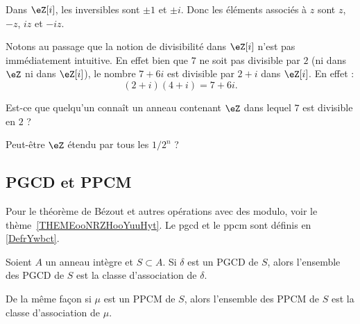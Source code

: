 \begin{example}
    Dans \( \eZ[i]\), les inversibles sont \( \pm 1\) et \( \pm i\). Donc les éléments associés à \( z\) sont \( z\), \( -z\), \( iz\) et \( -iz\).

    Notons au passage que la notion de divisibilité dans \( \eZ[i]\) n'est pas immédiatement intuitive. En effet bien que \( 7\) ne soit pas divisible par \( 2\) (ni dans \( \eZ\) ni dans \( \eZ[i]\)), le nombre \( 7+6i\) est divisible par \( 2+i\) dans \( \eZ[i]\). En effet :
    \begin{equation}
        (2+i)(4+i)=7+6i.
    \end{equation}
\end{example}

\begin{probleme}
    Est-ce que quelqu'un connaît un anneau contenant \( \eZ\) dans lequel \( 7\) est divisible en \( 2\) ?

    Peut-être \( \eZ\) étendu par tous les \( 1/2^n\) ?
\end{probleme}

\subsection{PGCD et PPCM}

Pour le théorème de Bézout et autres opérations avec des modulo, voir le thème~\ref{THEMEooNRZHooYuuHyt}. Le pgcd et le ppcm sont définis en \ref{DefrYwbct}.

\begin{lemma}
    Soient \( A\) un anneau intègre et \( S\subset A\). Si \( \delta\) est un PGCD de \( S\), alors l'ensemble des PGCD de \( S\) est la classe d'association de \( \delta\).

    De la même façon si \( \mu\) est un PPCM de \( S\), alors l'ensemble des PPCM de \( S\) est la classe d'association de \( \mu\).
\end{lemma}

